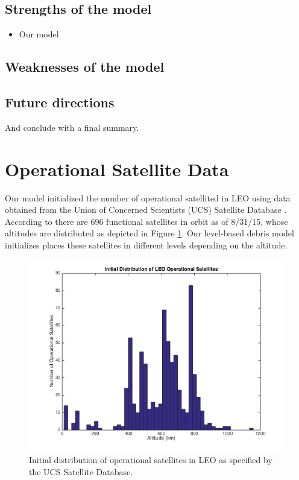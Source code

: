 \documentclass[pre,12pt]{revtex4-1}
\begin{document}
\subsection{Strengths of the model}

\begin{itemize}
	\item Our model
\end{itemize}

\subsection{Weaknesses of the model}

\subsection{Future directions}

And conclude with a final summary. 

\clearpage




\clearpage
\appendix

\section{Operational Satellite Data}\label{AppendixA}

Our model initialized the number of operational satellited in LEO using data obtained from the Union of Concerned Scientists (UCS) Satellite Database \cite{satelliteDB}. According to \cite{satelliteDB} there are 696 functional satellites in orbit as of 8/31/15, whose altitudes are distributed as depicted in Figure \ref{fig:initDistOpSat}. Our level-based debris model initializes places these satellites in different levels depending on the altitude.

\begin{figure}[h!]
	\includegraphics[width=.8\textwidth]{"Figures/initDistributionOfOperationalSatellites"}
	\caption{Initial distribution of operational satellites in LEO as specified by the UCS Satellite Database.}
	\label{fig:initDistOpSat}
\end{figure}
\end{document}
